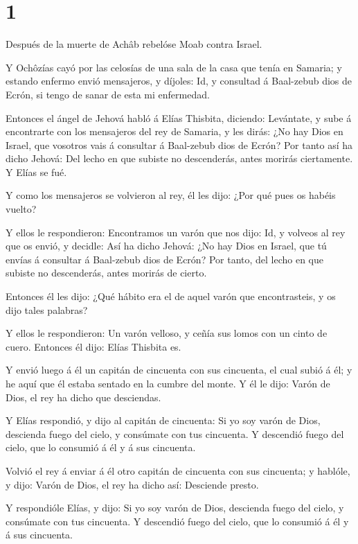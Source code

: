 \hypertarget{section}{%
\section{1}\label{section}}

 Después de la muerte de Achâb rebelóse Moab contra Israel.

 Y Ochôzías cayó por las celosías de una sala de la casa que
tenía en Samaria; y estando enfermo envió mensajeros, y díjoles: Id, y
consultad á Baal-zebub dios de Ecrón, si tengo de sanar de esta mi
enfermedad.

 Entonces el ángel de Jehová habló á Elías Thisbita,
diciendo: Levántate, y sube á encontrarte con los mensajeros del rey de
Samaria, y les dirás: ¿No hay Dios en Israel, que vosotros vais á
consultar á Baal-zebub dios de Ecrón?  Por tanto así ha
dicho Jehová: Del lecho en que subiste no descenderás, antes morirás
ciertamente. Y Elías se fué.

 Y como los mensajeros se volvieron al rey, él les dijo:
¿Por qué pues os habéis vuelto?

 Y ellos le respondieron: Encontramos un varón que nos dijo:
Id, y volveos al rey que os envió, y decidle: Así ha dicho Jehová: ¿No
hay Dios en Israel, que tú envías á consultar á Baal-zebub dios de
Ecrón? Por tanto, del lecho en que subiste no descenderás, antes morirás
de cierto.

 Entonces él les dijo: ¿Qué hábito era el de aquel varón que
encontrasteis, y os dijo tales palabras?

 Y ellos le respondieron: Un varón velloso, y ceñía sus
lomos con un cinto de cuero. Entonces él dijo: Elías Thisbita es.

 Y envió luego á él un capitán de cincuenta con sus
cincuenta, el cual subió á él; y he aquí que él estaba sentado en la
cumbre del monte. Y él le dijo: Varón de Dios, el rey ha dicho que
desciendas.

 Y Elías respondió, y dijo al capitán de cincuenta: Si yo
soy varón de Dios, descienda fuego del cielo, y consúmate con tus
cincuenta. Y descendió fuego del cielo, que lo consumió á él y á sus
cincuenta.

 Volvió el rey á enviar á él otro capitán de cincuenta con
sus cincuenta; y hablóle, y dijo: Varón de Dios, el rey ha dicho así:
Desciende presto.

 Y respondióle Elías, y dijo: Si yo soy varón de Dios,
descienda fuego del cielo, y consúmate con tus cincuenta. Y descendió
fuego del cielo, que lo consumió á él y á sus cincuenta.

